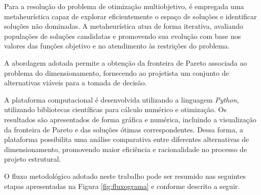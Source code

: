 Para a resolução do problema de otimização multiobjetivo, é empregada uma metaheurística capaz de explorar eficientemente o espaço de soluções e identificar soluções não dominadas. A metaheurística atua de forma iterativa, avaliando populações de soluções candidatas e promovendo sua evolução com base nos valores das funções objetivo e no atendimento às restrições do problema.

A abordagem adotada permite a obtenção da fronteira de Pareto associada ao problema do dimensionamento, fornecendo ao projetista um conjunto de alternativas viáveis para a tomada de decisão.

A plataforma computacional é desenvolvida utilizando a linguagem \textit{Python}, utilizando bibliotecas científicas para cálculo numérico e otimização. 
Os resultados são apresentados de forma gráfica e numérica, incluindo a visualização da fronteira de Pareto e das soluções ótimas correspondentes. Dessa forma, a plataforma possibilita uma análise comparativa entre diferentes alternativas de dimensionamento, promovendo maior eficiência e racionalidade no processo de projeto estrutural.

O fluxo metodológico adotado neste trabalho pode ser resumido nas seguintes etapas apresentadas na Figura \ref{fig:fluxograma} e conforme descrito a seguir.


